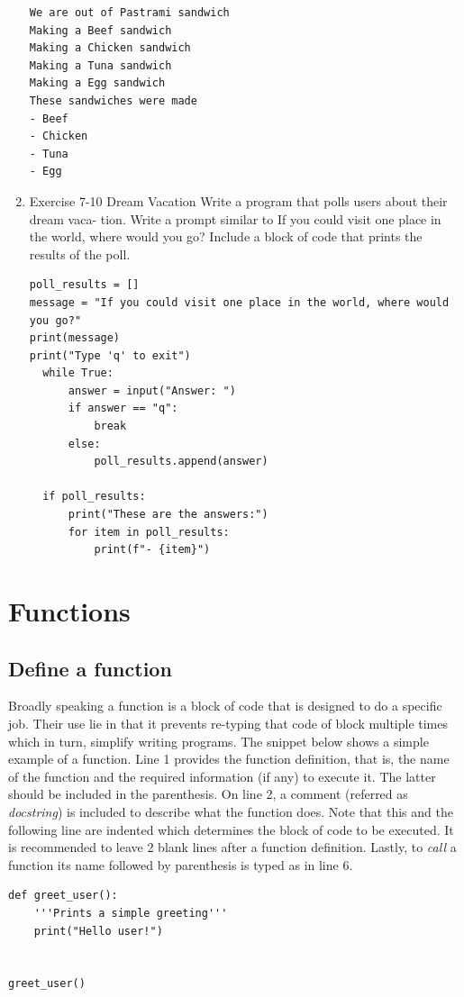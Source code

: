 \documentclass[10pt]{book}
\begin{document}
\begin{enumerate}
\label{org0309355}
\begin{verbatim}
We are out of Pastrami sandwich
Making a Beef sandwich
Making a Chicken sandwich
Making a Tuna sandwich
Making a Egg sandwich
These sandwiches were made
- Beef
- Chicken
- Tuna
- Egg
\end{verbatim}
\item Exercise 7-10 Dream Vacation
\label{sec:orgdfc2653}
Write a program that polls users about their dream vaca- tion. Write a prompt similar to If you could visit one place in the world, where would you go? Include a block of code that prints the results of the poll.
\begin{verbatim}
poll_results = []
message = "If you could visit one place in the world, where would you go?"
print(message)
print("Type 'q' to exit")
  while True:
      answer = input("Answer: ")
      if answer == "q":
          break
      else:
          poll_results.append(answer)

  if poll_results:
      print("These are the answers:")
      for item in poll_results:
          print(f"- {item}")
\end{verbatim}
\end{enumerate}
\chapter{Functions}
\label{sec:org54b78a1}
\section{Define a function}
\label{sec:org89d2c93}
Broadly speaking a function is a block of code that is designed to do a specific job. Their use lie in that it prevents re-typing that code of block multiple times which in turn, simplify writing programs. The snippet below shows a simple example of a function. Line 1 provides the function definition, that is, the name of the function and the required information (if any) to execute it. The latter should be included in the parenthesis. On line 2, a comment (referred as \emph{docstring}) is included to describe what the function does. Note that this and the following line are indented which determines the block of code to be executed. It is recommended to leave 2 blank lines after a function definition.  Lastly, to \emph{call} a function its name followed by parenthesis is typed as in line 6.

\label{org41f4d8a}
\begin{verbatim}
def greet_user():
    '''Prints a simple greeting'''
    print("Hello user!")


greet_user()
\end{verbatim}
\end{document}
